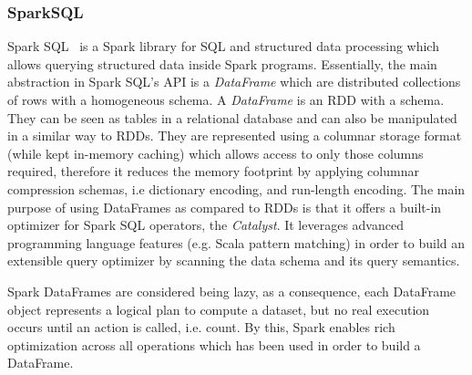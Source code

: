 \subsubsection{SparkSQL}
Spark SQL~\cite{Armbrust2015SSR} is a Spark library for SQL and structured data processing which allows querying structured data inside Spark programs.
Essentially, the main abstraction in Spark SQL’s \gls{API} is a \textit{DataFrame} which are distributed collections of rows with a homogeneous schema.
A \textit{DataFrame} is an \gls{RDD} with a schema.
They can be seen as tables in a relational database and can also be manipulated in a similar way to \gls{RDD}s.
They are represented using a columnar storage format (while kept in-memory caching) which allows access to only those columns required, therefore it reduces the memory footprint by applying columnar compression schemas, i.e dictionary encoding, and run-length encoding.
The main purpose of using DataFrames as compared to \gls{RDD}s is that it offers a built-in optimizer for Spark SQL operators, the \textit{Catalyst}.
It leverages advanced programming language features (e.g. Scala pattern matching) in order to build an extensible query optimizer by scanning the data schema and its query semantics.

Spark DataFrames are considered being lazy, as a consequence, each DataFrame object represents a logical plan to compute a dataset, but no real execution occurs until an action is called, i.e. count.
By this, Spark enables rich optimization across all operations which has been used in order to build a DataFrame.


